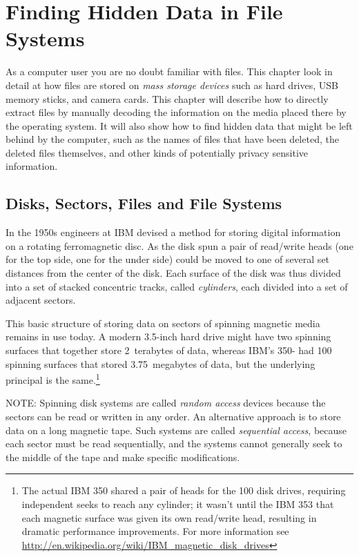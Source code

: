

\chapter{Finding Hidden Data in File Systems}
As a computer user you are no doubt familiar with files. This
chapter look in detail at how files are stored on \emph{mass
  storage devices} such as hard drives, USB memory sticks, and camera
cards. This chapter will describe how to directly extract files by
manually decoding the information on the media placed there by the
operating system. It will also show how to find hidden data that might
be left behind by the computer, such as the names of files that have
been deleted, the deleted files themselves, and other kinds of
potentially privacy sensitive information. 

\section{Disks, Sectors, Files and File Systems}
In the 1950s engineers at IBM devised a method for storing digital
information on a rotating ferromagnetic disc. As the disk spun a pair
of read/write heads (one for the top side, one for the under side)
could be moved to one of several set distances from the center of the
disk. Each surface of the disk was thus divided into a set of stacked
concentric tracks, called \emph{cylinders}, each divided into a set of
adjacent sectors.




This basic structure of storing data on sectors of spinning magnetic
media remains in use today. A modern 3.5-inch hard drive might have two
spinning surfaces that together store 2~terabytes of data, whereas
IBM's 350- had 100 spinning surfaces that stored 3.75~megabytes of
data, but the underlying principal is the same.\footnote{The actual IBM 350
  shared a pair of heads for the 100 disk drives, requiring
  independent seeks to reach any cylinder; it wasn't until the IBM 353
  that each magnetic surface was given its own read/write head,
  resulting in dramatic performance improvements. For more information
  see \url{http://en.wikipedia.org/wiki/IBM_magnetic_disk_drives}}

NOTE: Spinning disk systems are called \emph{random access} devices because
the sectors can be read or written in any order. An alternative
approach is to store data on a long magnetic tape. Such systems are
called \emph{sequential access}, because each sector must be read
sequentially, and the systems cannot generally seek to the middle of the
tape and make specific modifications.

